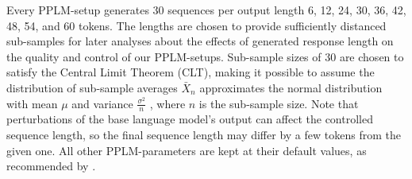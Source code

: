 

Every PPLM-setup generates 30 sequences per output length 6, 12, 24, 30, 36, 42, 48, 54, and 60 tokens. 
The lengths are chosen to provide sufficiently distanced sub-samples for later analyses about the effects of generated response length on the quality and control of our PPLM-setups.
Sub-sample sizes of 30 are chosen to satisfy the Central Limit Theorem (CLT), making it possible to assume the distribution of sub-sample averages $\bar{X}_n$ approximates the normal distribution with mean $\mu$ and variance $\frac{\sigma^2}{n}$ \citep{CLT2008springer}, where $n$ is the sub-sample size.
Note that perturbations of the base language model's output can affect the controlled sequence length, so the final sequence length may differ by a few tokens from the given one. All other PPLM-parameters are kept at their default values, as recommended by \cite{dathathri2019plug}. 

